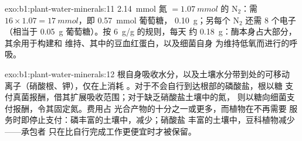 \begin{solution}{exo:b1:plant-water-minerals:11}
\qty{2.14}{mmol} 氮 $= \qty{1.07}{mmol}$ 的 $\mathrm{N_2}$：需
 $16\times 1.07 = \qty{17}{mmol}$，即 \qty{0.57}{mmol} 葡萄糖，
\qty{0.10}{g}；另每个 $\mathrm{N_2}$ 还需 8 个电子（相当于
\qty{0.05}{g} 葡萄糖）。按 \qty{6}{g/g} 的规则，每天
约 \qty{0.18}{g}：酶本身占大部分，其余用于构建和
维持、其中的豆血红蛋白，以及细菌自身
为维持低氧而进行的呼吸。
\end{solution}

\begin{solution}{exo:b1:plant-water-minerals:12}
根自身吸收水分，以及土壤水分带到处的可移动
离子（硝酸根、钾），仅在上消耗
。对于不会自行到达根部的磷酸盐，根以糖
支付真菌报酬，借其扩展吸收范围；对于缺乏硝酸盐土壤中的氮，
则以糖向细菌支付报酬，令其固定氮。费用占
光合产物的十分之一或更多，而植物在不再需要
服务时即停止支付：磷丰富的土壤中，减少；硝酸盐
丰富的土壤中，豆科植物减少——承包者
只在比自行完成工作更便宜时才被保留。
\end{solution}

